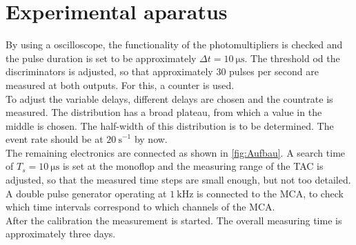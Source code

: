 \chapter{Experimental aparatus}
\label{cha:Durchführung}

By using a oscilloscope, the functionality of the photomultipliers is checked and the pulse duration is set to be approximately $\Delta t = \qty{10}{\micro\second}$. The threshold od the discriminators
is adjusted, so that approximately 30 pulses per second are measured at both outputs. For this, a counter is used.\\
To adjust the variable delays, different delays are chosen and the countrate is measured. The distribution has a broad plateau, from which a value
in the middle is chosen. The half-width of this distribution is to be determined. The event rate should be at $\qty{20}{\second}^{-1}$ by now.\\
The remaining electronics are connected as shown in \autoref{fig:Aufbau}. A search time of $T_s = \qty{10}{\micro\second}$ is set at the monoflop
and the measuring range of the TAC is adjusted, so that the measured time steps are small enough, but not too detailed.\\
A double pulse generator operating at $\qty{1}{\kilo\hertz}$ is connected to the MCA, to check which time intervals correspond to which channels of the
MCA. \\
After the calibration the measurement is started. The overall measuring time is approximately three days.
